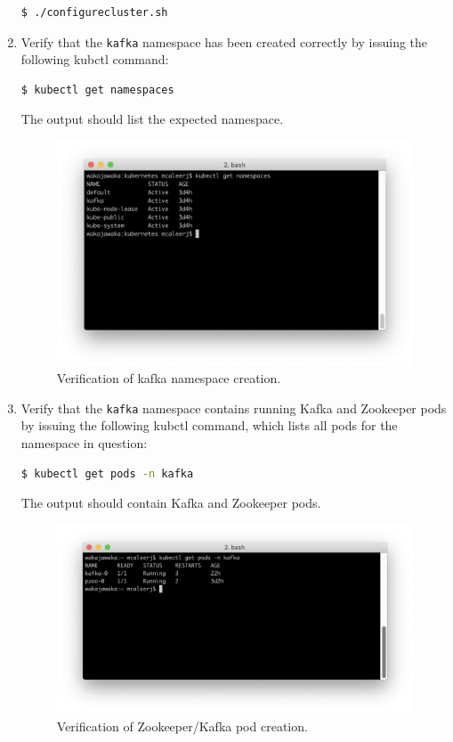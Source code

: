 \begin{enumerate}
\begin{lstlisting}[language=bash]
$ ./configurecluster.sh
\end{lstlisting}


 \item Verify that the \texttt{kafka} namespace has been created correctly by issuing the following kubctl command:
 
 \begin{lstlisting}[language=bash]
 $ kubectl get namespaces
 \end{lstlisting}

The output should list the expected namespace.

\begin{figure}[H]
	\centering  
	\includegraphics[width=\linewidth]{figures/appendixA/namespaces.png}
	\caption{Verification of kafka namespace creation.}
\end{figure}

 \item Verify that the \texttt{kafka} namespace contains running Kafka and Zookeeper pods by issuing the following kubctl command, which lists all pods for the namespace in question:

\begin{lstlisting}[language=bash]
$ kubectl get pods -n kafka
\end{lstlisting}

The output should contain Kafka and Zookeeper pods.

\begin{figure}[H]
	\centering  
	\includegraphics[width=\linewidth]{figures/appendixA/kafka-pods.png}
	\caption{Verification of Zookeeper/Kafka pod creation.}
\end{figure}



\end{enumerate}
